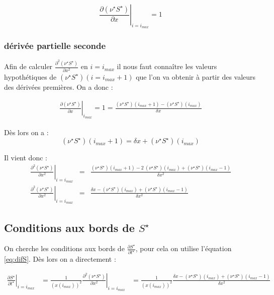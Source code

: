 \begin{equation}
  \label{eq:nuS_n_is_null}
  \left. \frac{\partial (\nu^{\star} S^{\star})}{\partial x}\right|_{i=i_{max}}=1
\end{equation}


\subsubsection{dérivée partielle seconde}
Afin de calculer $\frac{\partial^2(\nu^{\star} S^{\star})} {\partial x^2}$ en $i=i_{max}$ il nous faut connaître les valeurs hypothétiques de $(\nu^{\star} S^{\star})(i=i_{max}+1)$ que l'on va obtenir à partir des valeurs des dérivées premières. On a donc :

\begin{eqnarray}
  \left. \frac{\partial (\nu^{\star}S^{\star})}{\partial x} \right|_{i_{max}} = 1 = \frac{(\nu^{\star} S^{\star})(i_{max}+1)-(\nu^{\star}S^{\star})(i_{max})}{\delta x} 
\end{eqnarray}

Dès lors on a : 
\begin{equation}
( \nu^{\star} S^{\star})(i_{max}+1) = \delta x + (\nu^{\star}S^{\star})(i_{max}) 
\end{equation}

Il vient donc :
\begin{eqnarray}
 \left. \frac{\partial^2 (\nu^{\star} S^{\star})}{\partial x^2}\right|_{i=i_{max}} &=& \frac{(\nu^{\star} S^{\star})(i_{max}+1) - 2\ (\nu^{\star} S^{\star})(i_{max}) + (\nu^{\star} S^{\star})(i_{max}-1)}{\delta x^2}\\
 \left. \frac{\partial^2 (\nu^{\star} S^{\star})}{\partial x^2}\right|_{i=i_{max}} &=& \frac{\delta x - (\nu^{\star} S^{\star})(i_{max}) + (\nu^{\star} S^{\star})(i_{max}-1)}{\delta x^2}
\end{eqnarray}

\subsection{Conditions aux bords de $S^{\star}$}
On cherche les conditions aux bords de $\frac{\partial S^{\star}}{\partial t^{\star}}$, pour cela on utilise l'équation \eqref{eq:difS}. Dès lors on a directement :

\begin{eqnarray}
  \left. \frac{\partial S^{\star}}{\partial t^{\star}} \right|_{i=i_{max}}&= \frac{1}{(x(i_{max}))^2} \left. \frac{\partial^2 (\nu^{\star} S^{\star})}{\partial x^2}\right|_{i=i_{max}} &= \frac{1}{(x(i_{max}))^2} \frac{\delta x - (\nu^{\star} S^{\star})(i_{max}) + (\nu^{\star} S^{\star})(i_{max}-1)}{\delta x^2}
\end{eqnarray}


